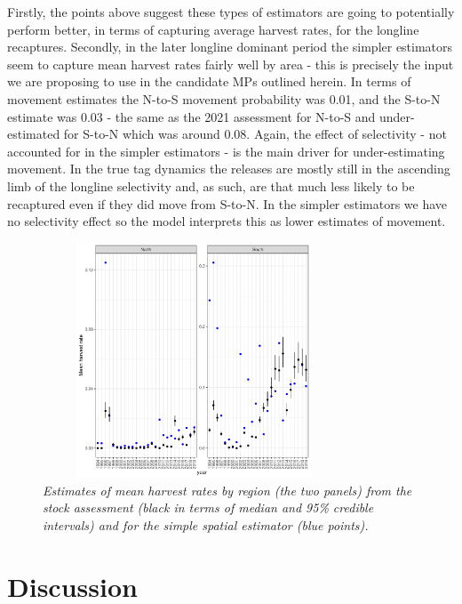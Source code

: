 \documentclass[12pt,a4paper,twoside,times,sky,standard]{csiroreport2017}
\begin{document}
Firstly, the points above suggest these types of estimators are going to potentially perform better, in terms of capturing average harvest rates, for the longline recaptures. Secondly, in the later longline dominant period the simpler estimators seem to capture mean harvest rates fairly well by area - this is precisely the input we are proposing to use in the candidate MPs outlined herein. In terms of movement estimates the N-to-S movement probability was 0.01, and the S-to-N estimate was 0.03 - the same as the 2021 assessment for N-to-S and under-estimated for S-to-N which was around 0.08. Again, the effect of selectivity - not accounted for in the simpler estimators - is the main driver for under-estimating movement. In the true tag dynamics the releases are mostly still in the ascending limb of the longline selectivity and, as such, are that much less likely to be recaptured even if they did move from S-to-N. In the simpler estimators we have no selectivity effect so the model interprets this as lower estimates of movement. 

\begin{figure}[hb]
    \begin{center}
        \includegraphics[width=9cm,height=7cm]{figs/hbarcomp_mpvstkass.pdf}
    \end{center}
    \caption{\textit{Estimates of mean harvest rates by region (the two panels) from the stock assessment (black in terms of median and 95\% credible intervals) and for the simple spatial estimator (blue points).}}
\end{figure}

\section{Discussion}
\end{document}
